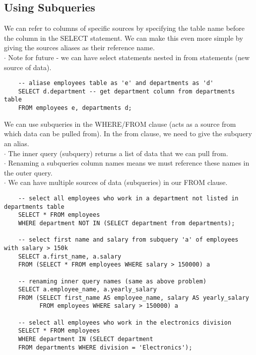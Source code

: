 \documentclass[11pt, a4paper]{article}
\begin{document}
\begin{spacing}{1.1}
	\subsection{Using Subqueries}
	We can refer to columns of specific sources by specifying the table name before the column in the SELECT statement. We can make this even more simple by giving the sources aliases as their reference name. \\
	\hspace*{3mm} $\cdot$ Note for future - we can have select statements nested in from statements (new source of data).
	\begin{lstlisting}
	-- aliase employees table as 'e' and departments as 'd'
	SELECT d.department -- get department column from departments table
	FROM employees e, departments d; \end{lstlisting} \vspace*{1mm}
	We can use subqueries in the WHERE/FROM clause (acts as a source from which data can be pulled from). In the from clause, we need to give the subquery an alias. \\
	\hspace*{3mm} $\cdot$ The inner query (subquery) returns a list of data that we can pull from. \\
	\hspace*{3mm} $\cdot$ Renaming a subqueries column names means we must reference these names in the outer query. \\
	\hspace*{3mm} $\cdot$ We can have multiple sources of data (subqueries) in our FROM clause.
	\begin{lstlisting}
	-- select all employees who work in a department not listed in departments table
	SELECT * FROM employees
	WHERE department NOT IN (SELECT department from departments);
	
	-- select first name and salary from subquery 'a' of employees with salary > 150k
	SELECT a.first_name, a.salary 
	FROM (SELECT * FROM employees WHERE salary > 150000) a
	
	-- renaming inner query names (same as above problem)
	SELECT a.employee_name, a.yearly_salary 
	FROM (SELECT first_name AS employee_name, salary AS yearly_salary
	      FROM employees WHERE salary > 150000) a 
	      
	-- select all employees who work in the electronics division
	SELECT * FROM employees
	WHERE department IN (SELECT department 
	FROM departments WHERE division = 'Electronics');
	

\end{lstlisting}
\end{spacing}
\end{document}
